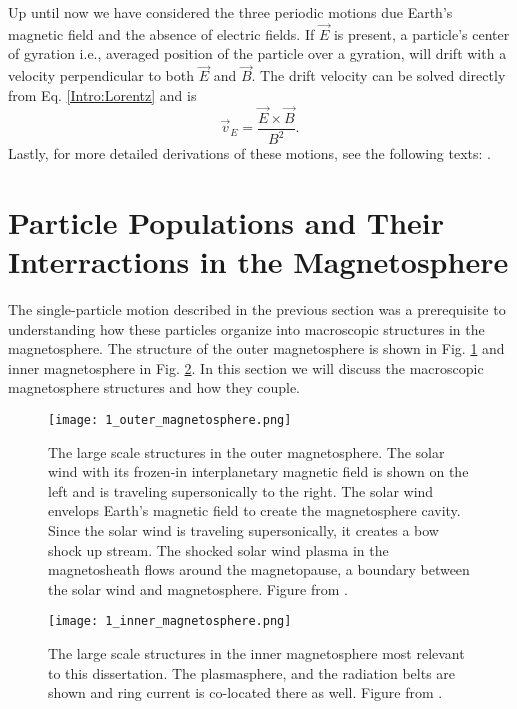 Up until now we have considered the three periodic motions due Earth's magnetic field and the absence of electric fields. If $\vec{E}$ is present, a particle's center of gyration i.e., averaged position of the particle over a gyration, will drift with a velocity perpendicular to both $\vec{E}$ and $\vec{B}$. The drift velocity can be solved directly from Eq. \ref{Intro:Lorentz} and is
\begin{equation}
\vec{v}_E = \frac{\vec{E} \times \vec{B}}{B^2}.
\end{equation} Lastly, for more detailed derivations of these motions, see the following texts: \citet{Baumjohann1997, Schulz1974, Tsurutani1997}.
        
\section{Particle Populations and Their Interractions in the Magnetosphere}\label{ntro:particle_populations}
The single-particle motion described in the previous section was a prerequisite to understanding how these particles organize into macroscopic structures in the magnetosphere. The structure of the outer magnetosphere is shown in Fig. \ref{Intro:outer_magnetosphere} and inner magnetosphere in Fig. \ref{Intro:inner_magnetosphere}. In this section we will discuss the macroscopic magnetosphere structures and how they couple.

\begin{figure}
\texttt{[image: 1\_outer\_magnetosphere.png]}
\caption{The large scale structures in the outer magnetosphere. The solar wind with its frozen-in interplanetary magnetic field is shown on the left and is traveling supersonically to the right. The solar wind envelops Earth's magnetic field to create the magnetosphere cavity. Since the solar wind is traveling supersonically, it creates a bow shock up stream. The shocked solar wind plasma in the magnetosheath flows around the magnetopause, a boundary between the solar wind and magnetosphere. Figure from \citet{Baumjohann1997}.}
\label{Intro:outer_magnetosphere}
\end{figure}

\begin{figure}
\texttt{[image: 1\_inner\_magnetosphere.png]}
\caption{The large scale structures in the inner magnetosphere most relevant to this dissertation. The plasmasphere, and the radiation belts are shown and ring current is co-located there as well. Figure from \citet{Baumjohann1997}.}
\label{Intro:inner_magnetosphere}
\end{figure}

